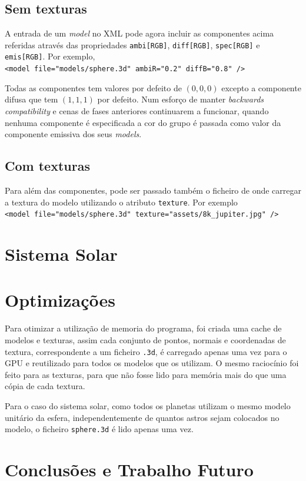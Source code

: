 \documentclass[a4paper]{article}
\begin{document}
\subsection{Sem texturas}
A entrada de um \textit{model} no XML pode agora incluir as componentes acima
referidas através das propriedades \texttt{ambi[RGB]}, \texttt{diff[RGB]},
\texttt{spec[RGB]} e \texttt{emis[RGB]}. Por exemplo,\\
\verb!<model file="models/sphere.3d" ambiR="0.2" diffB="0.8" />!

Todas as componentes tem valores por defeito de $(0,0,0)$ excepto a componente
difusa que tem $(1,1,1)$ por defeito. Num esforço de manter \textit{backwards
compatibility} e cenas de fases anteriores continuarem a funcionar, quando
nenhuma componente é especificada a cor do grupo é passada como valor da
componente emissiva dos seus \textit{models}.

\subsection{Com texturas}

Para além das componentes, pode ser passado também o ficheiro de onde carregar
a textura do modelo utilizando o atributo \texttt{texture}. Por exemplo\\
\verb!<model file="models/sphere.3d" texture="assets/8k_jupiter.jpg" />!

\section{Sistema Solar}

\section{Optimizações}
Para otimizar a utilização de memoria do programa, foi criada uma cache de
modelos e texturas, assim cada conjunto de pontos, normais e coordenadas de
textura, correspondente a um ficheiro \texttt{.3d}, é carregado apenas uma vez
para o GPU e reutilizado para todos os modelos que os utilizam. O mesmo
raciocínio foi feito para as texturas, para que não fosse lido para memória
mais do que uma cópia de cada textura.

Para o caso do sistema solar, como todos os planetas utilizam o mesmo modelo
unitário da esfera, independentemente de quantos astros sejam colocados no
modelo, o ficheiro \texttt{sphere.3d} é lido apenas uma vez.

\section{Conclusões e Trabalho Futuro}
\end{document}
